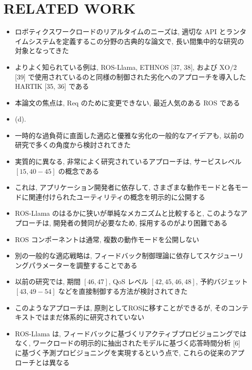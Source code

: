 
\section{RELATED WORK}
\label{sec: related work}

\begin{frame}{}
    \begin{itemize}
        \item ロボティクスワークロードのリアルタイムのニーズは, 適切な API とランタイムシステムを定義するこの分野の古典的な論文で, 長い間集中的な研究の対象となってきた
\item よりよく知られている例は, ROS-Llama, ETHNOS [37, $38]$, および $\mathrm{XO} / 2$ [39] で使用されているのと同様の制御された劣化へのアプローチを導入した HARTIK [35, 36] である
\item 本論文の焦点は, Req のために変更できない, 最近人気のある ROS である
\item (d).
    \end{itemize}
\end{frame}

\begin{frame}{}
    \begin{itemize}
        \item  一時的な過負荷に直面した適応と優雅な劣化の一般的なアイデアも, 以前の研究で多くの角度から検討されてきた
\item 実質的に異なる, 非常によく研究されているアプローチは, サービスレベル $[15,40-45]$ の概念である
\item これは, アプリケーション開発者に依存して, さまざまな動作モードと各モードに関連付けられたユーティリティの概念を明示的に公開する
\item ROS-Llama のはるかに狭いが単純なメカニズムと比較すると, このようなアプローチは, 開発者の賛同が必要なため, 採用するのがより困難である
\item ROS コンポーネントは通常, 複数の動作モードを公開しない
    \end{itemize}
\end{frame}

\begin{frame}{}
    \begin{itemize}
        \item 別の一般的な適応戦略は, フィードバック制御理論に依存してスケジューリングパラメーターを調整することである
\item 以前の研究では, 期間 $[46,47]$, QoS レベル $[42,45,46,48]$, 予約バジェット $[43,49-54]$ などを直接制御する方法が検討されてきた
\item このようなアプローチは, 原則としてROSに移すことができるが, そのコンテキストではまだ体系的に研究されていない
\item ROS-Llama は, フィードバックに基づくリアクティブプロビジョニングではなく, ワークロードの明示的に抽出されたモデルに基づく応答時間分析 [6] に基づく予測プロビジョニングを実現するという点で, これらの従来のアプローチとは異なる
    \end{itemize}
\end{frame}

